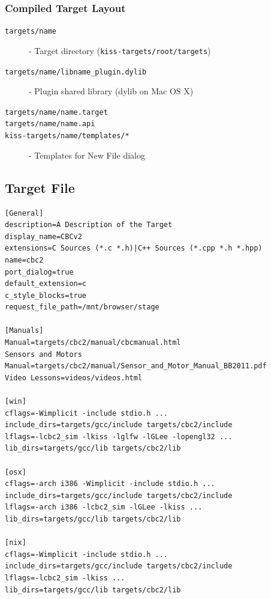\documentclass[7pt,letterpaper]{article}
\newcommand{\code}[1]{\texttt{#1}}
\begin{document}
	\subsubsection{Compiled Target Layout}
	\begin{description}
	\item[\code{targets/name}] - Target directory (\code{kiss-targets/root/targets})
	\item[\code{targets/name/libname\_plugin.dylib}] - Plugin shared library (dylib on Mac OS X)
	\item[\code{targets/name/name.target}]
	\item[\code{targets/name/name.api}]
	\item[\code{kiss-targets/name/templates/*}] - Templates for New File dialog
	\end{description}
	\singlespacing
	
	\subsection{Target File}
	
	\begin{lstlisting}
[General]
description=A Description of the Target
display_name=CBCv2
extensions=C Sources (*.c *.h)|C++ Sources (*.cpp *.h *.hpp)
name=cbc2
port_dialog=true
default_extension=c
c_style_blocks=true
request_file_path=/mnt/browser/stage

[Manuals]
Manual=targets/cbc2/manual/cbcmanual.html
Sensors and Motors Manual=targets/cbc2/manual/Sensor_and_Motor_Manual_BB2011.pdf
Video Lessons=videos/videos.html

[win]
cflags=-Wimplicit -include stdio.h ...
include_dirs=targets/gcc/include targets/cbc2/include
lflags=-lcbc2_sim -lkiss -lglfw -lGLee -lopengl32 ...
lib_dirs=targets/gcc/lib targets/cbc2/lib

[osx]
cflags=-arch i386 -Wimplicit -include stdio.h ...
include_dirs=targets/gcc/include targets/cbc2/include
lflags=-arch i386 -lcbc2_sim -lGLee -lkiss ...
lib_dirs=targets/gcc/lib targets/cbc2/lib

[nix]
cflags=-Wimplicit -include stdio.h ...
include_dirs=targets/gcc/include targets/cbc2/include
lflags=-lcbc2_sim -lkiss ...
lib_dirs=targets/gcc/lib targets/cbc2/lib
	\end{lstlisting}
	\vspace{.25in}
	
\end{document}
